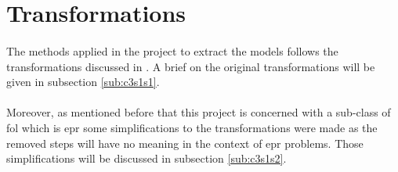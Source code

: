 \section{Transformations}\label{sec:c3s1}
\paragraph{}
The methods applied in the project to extract the models follows the transformations discussed in \cite{BMUG06}. A brief on the original transformations will be given in subsection \ref{sub:c3s1s1}.

\paragraph{}
Moreover, as mentioned before that this project is concerned with a sub-class of \ac{fol} which is \ac{epr} some simplifications to the transformations were made as the removed steps will have no meaning in the context of \ac{epr} problems. Those simplifications will be discussed in subsection \ref{sub:c3s1s2}.

	
	
	